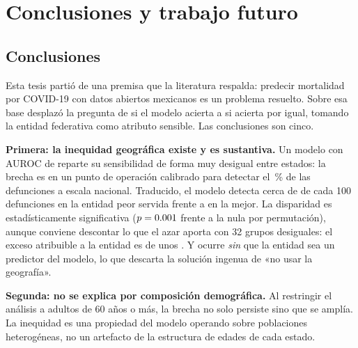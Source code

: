 \chapter{Conclusiones y trabajo futuro}
\label{cap:conclusiones}

\section{Conclusiones}

Esta tesis partió de una premisa que la literatura respalda: predecir mortalidad
por COVID-19 con datos abiertos mexicanos es un problema resuelto. Sobre esa base
desplazó la pregunta de si el modelo acierta a si acierta por igual, tomando la
entidad federativa como atributo sensible. Las conclusiones son cinco.

\textbf{Primera: la inequidad geográfica existe y es sustantiva.} Un modelo con
AUROC de \aurocGlobal{} reparte su sensibilidad de forma muy desigual entre
estados: la brecha es \gapTPRentidad{} en un punto de operación calibrado para
detectar el \sensObjetivo\,\% de las defunciones a escala nacional. Traducido, el
modelo detecta cerca de \entPeorPct{} de cada 100 defunciones en la entidad peor
servida frente a \entMejorPct{} en la mejor. La disparidad es estadísticamente
significativa ($p=0.001$ frente a la nula por permutación), aunque conviene
descontar lo que el azar aporta con 32 grupos desiguales: el exceso atribuible a
la entidad es de unos \excesoTpr. Y ocurre \emph{sin} que la entidad sea un
predictor del modelo, lo que descarta la solución ingenua de «no usar la
geografía».

\textbf{Segunda: no se explica por composición demográfica.} Al restringir el
análisis a adultos de 60 años o más, la brecha no solo persiste sino que se
amplía. La inequidad es una propiedad del modelo operando sobre poblaciones
heterogéneas, no un artefacto de la estructura de edades de cada estado.

